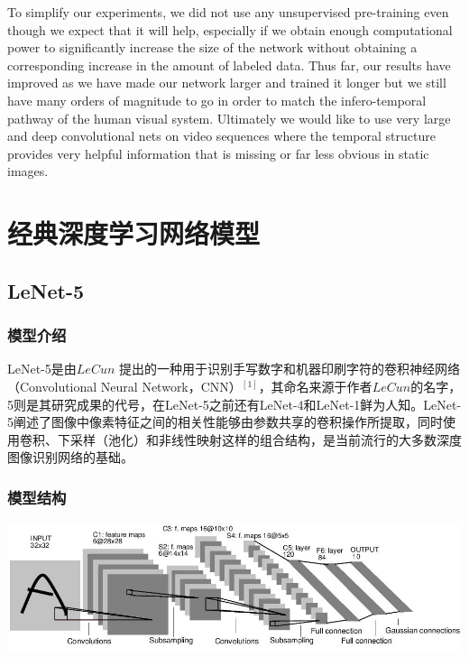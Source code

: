 \documentclass[12pt,a4paper,UTF8,twoside]{book}
\begin{document}
To simplify our experiments, we did not use any unsupervised pre-training even though we expect that it will help, especially if we obtain enough computational power to significantly increase the size of the network without obtaining a corresponding increase in the amount of labeled data. Thus far, our results have improved as we have made our network larger and trained it longer but we still have many orders of magnitude to go in order to match the infero-temporal pathway of the human visual system. Ultimately we would like to use very large and deep convolutional nets on video sequences where the temporal structure provides very helpful information that is missing or far less obvious in static images.

\hypertarget{ux7ecfux5178ux6df1ux5ea6ux5b66ux4e60ux7f51ux7edcux6a21ux578b}{%
\chapter{经典深度学习网络模型}\label{ux7ecfux5178ux6df1ux5ea6ux5b66ux4e60ux7f51ux7edcux6a21ux578b}}

\hypertarget{lenet-5}{%
\section{LeNet-5}\label{lenet-5}}

\hypertarget{ux6a21ux578bux4ecbux7ecd}{%
\subsection{模型介绍}\label{ux6a21ux578bux4ecbux7ecd}}

LeNet-5是由\(LeCun\) 提出的一种用于识别手写数字和机器印刷字符的卷积神经网络（Convolutional Neural Network，CNN）\(^{[1]}\)，其命名来源于作者\(LeCun\)的名字，5则是其研究成果的代号，在LeNet-5之前还有LeNet-4和LeNet-1鲜为人知。LeNet-5阐述了图像中像素特征之间的相关性能够由参数共享的卷积操作所提取，同时使用卷积、下采样（池化）和非线性映射这样的组合结构，是当前流行的大多数深度图像识别网络的基础。

\hypertarget{ux6a21ux578bux7ed3ux6784}{%
\subsection{模型结构}\label{ux6a21ux578bux7ed3ux6784}}

\begin{center}\includegraphics[width=0.7\linewidth]{img/02-01} \end{center}
\end{document}
